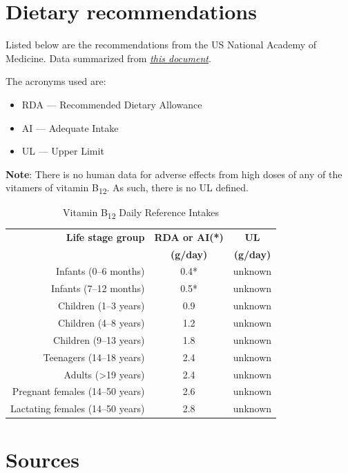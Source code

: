 \documentclass{book}
\begin{document}
\begin{sloppypar}
\section{Dietary recommendations}
Listed below are the recommendations from the US National Academy of Medicine. Data summarized from \href{https://nap.nationalacademies.org/read/6015/chapter/11}{\textit{this document}}.

The acronyms used are:
\begin{itemize}
	\item RDA --- Recommended Dietary Allowance
	\item AI --- Adequate Intake
	\item UL --- Upper Limit
\end{itemize}

\textbf{Note}: There is no human data for adverse effects from high doses of any of the vitamers of vitamin B\textsubscript{12}. As such, there is no UL defined.

\begin{table}[ht]
	\caption{Vitamin B\textsubscript{12} Daily Reference Intakes}
	\centering \begin{tabular}{| r | c | c |}
		\hline
		\textbf{Life stage group}			& \textbf{RDA or AI(*)}		& \textbf{UL}				\\
											& \textbf{(\textmu g/day)}	& \textbf{(\textmu g/day)}	\\ \hline
		Infants (0--6 months)				& 0.4*						& unknown					\\ \hline
		Infants (7--12 months)				& 0.5*						& unknown					\\ \hline
		Children (1--3 years)				& 0.9						& unknown					\\ \hline
		Children (4--8 years)				& 1.2						& unknown					\\ \hline
		Children (9--13 years)				& 1.8						& unknown					\\ \hline
		Teenagers (14--18 years)			& 2.4						& unknown					\\ \hline
		Adults (\textgreater19 years)		& 2.4						& unknown					\\ \hline
		Pregnant females (14--50 years)		& 2.6						& unknown					\\ \hline
		Lactating females (14--50 years)	& 2.8						& unknown					\\ \hline
	\end{tabular}
\end{table}
\newpage

\section{Sources}



\end{sloppypar}
\end{document}
